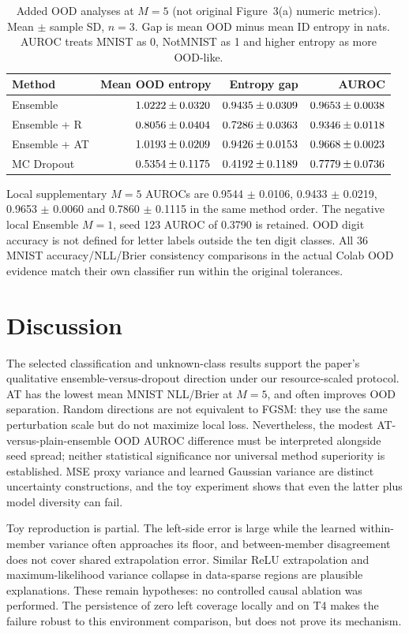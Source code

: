 \documentclass[11pt,a4paper]{article}
\begin{document}
\begin{table}[htbp]
\centering\small
\caption{Added OOD analyses at $M=5$ (not original Figure~3(a) numeric metrics). Mean $\pm$ sample SD, $n=3$. Gap is mean OOD minus mean ID entropy in nats. AUROC treats MNIST as 0, NotMNIST as 1 and higher entropy as more OOD-like.}
\label{tab:ood}
\begin{tabular}{lrrr}\toprule Method & Mean OOD entropy & Entropy gap & AUROC\\\midrule
Ensemble & $1.0222 \pm 0.0320$ & $0.9435 \pm 0.0309$ & $0.9653 \pm 0.0038$\\
Ensemble + R & $0.8056 \pm 0.0404$ & $0.7286 \pm 0.0363$ & $0.9346 \pm 0.0118$\\
Ensemble + AT & $1.0193 \pm 0.0209$ & $0.9426 \pm 0.0153$ & $0.9668 \pm 0.0023$\\
MC Dropout & $0.5354 \pm 0.1175$ & $0.4192 \pm 0.1189$ & $0.7779 \pm 0.0736$\\\bottomrule
\end{tabular}
\end{table}

Local supplementary $M=5$ AUROCs are 0.9544 $\pm$ 0.0106, 0.9433 $\pm$ 0.0219, 0.9653 $\pm$ 0.0060 and 0.7860 $\pm$ 0.1115 in the same method order. The negative local Ensemble $M=1$, seed 123 AUROC of 0.3790 is retained. OOD digit accuracy is not defined for letter labels outside the ten digit classes. All 36 MNIST accuracy/NLL/Brier consistency comparisons in the actual Colab OOD evidence match their own classifier run within the original tolerances.

\section{Discussion}
\label{sec:discussion}
The selected classification and unknown-class results support the paper's qualitative ensemble-versus-dropout direction under our resource-scaled protocol. AT has the lowest mean MNIST NLL/Brier at $M=5$, and often improves OOD separation. Random directions are not equivalent to FGSM: they use the same perturbation scale but do not maximize local loss. Nevertheless, the modest AT-versus-plain-ensemble OOD AUROC difference must be interpreted alongside seed spread; neither statistical significance nor universal method superiority is established. MSE proxy variance and learned Gaussian variance are distinct uncertainty constructions, and the toy experiment shows that even the latter plus model diversity can fail.

Toy reproduction is partial. The left-side error is large while the learned within-member variance often approaches its floor, and between-member disagreement does not cover shared extrapolation error. Similar ReLU extrapolation and maximum-likelihood variance collapse in data-sparse regions are plausible explanations. These remain hypotheses: no controlled causal ablation was performed. The persistence of zero left coverage locally and on T4 makes the failure robust to this environment comparison, but does not prove its mechanism.
\end{document}

